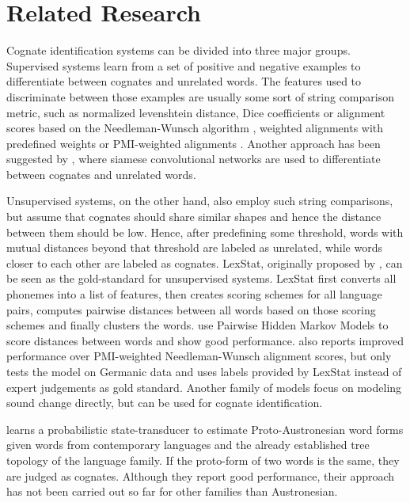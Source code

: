 \documentclass[6pt]{article}
\begin{document}
\section{Related Research}
\label{Related_Research}
Cognate identification systems can be divided into three major groups. Supervised systems learn from a set of positive and negative examples to differentiate between cognates and unrelated words. The features used to discriminate between those examples are usually some sort of  string comparison metric, such as normalized levenshtein distance, Dice coefficients or  alignment scores based on the Needleman-Wunsch algorithm  \citep{bergsma2007alignment,inkpen2005automatic}, weighted alignments with predefined weights \citep{kondrak2000new} or PMI-weighted alignments \citep{jager2014phylogenetic}. Another approach has been suggested by \cite{rama2016siamese}, where siamese convolutional networks are used to differentiate between cognates and unrelated words. 

Unsupervised systems, on the other hand, also employ such string comparisons, but assume that cognates should share similar shapes and hence the distance between them should be low. Hence, after predefining some threshold, words with mutual distances beyond that threshold are labeled as unrelated, while words closer to each other are labeled as cognates.  LexStat, originally proposed by \cite{list2012lexstat}, can be seen as the gold-standard for unsupervised systems. LexStat first converts all phonemes into a list of features, then creates scoring schemes for all language pairs, computes pairwise distances between all words based on those scoring schemes and finally clusters the words. \cite{mackay2005computing,wahle2013alignment} use Pairwise Hidden Markov Models to score distances between words and show good performance.  \cite{wahle2013alignment} also reports improved performance over PMI-weighted Needleman-Wunsch alignment scores, but only tests the model on Germanic data and uses labels provided by LexStat instead of expert judgements as gold standard. Another family of models focus on modeling sound change directly, but can be used for cognate identification. 

\cite{bouchard2013automated} learns a probabilistic state-transducer to estimate Proto-Austronesian word forms given words from contemporary languages and the already established tree topology of the language family. If the proto-form of two words is the same, they are judged as cognates. Although they report good performance, their approach has not been carried out so far for other families than Austronesian.
\end{document}
